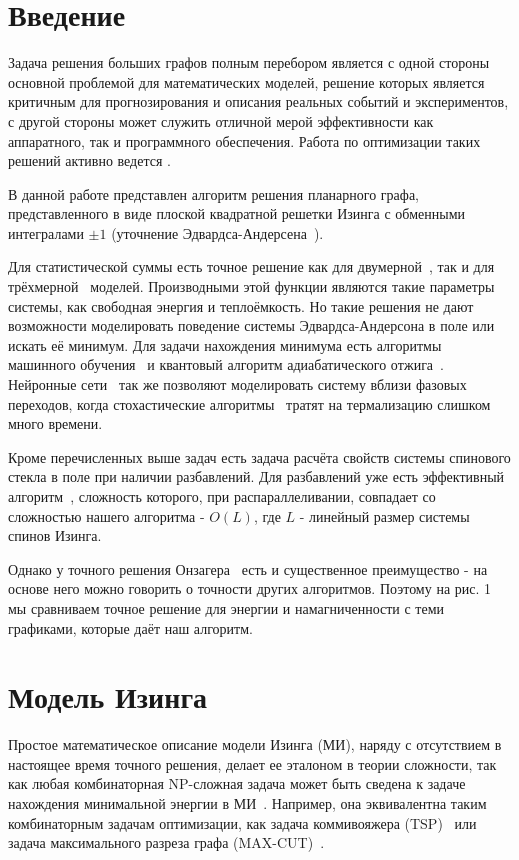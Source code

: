 \documentclass[10pt]{article}
\begin{document}
	
	\section*{Введение}
	
	Задача решения больших графов полным перебором является с одной стороны основной проблемой для математических моделей, решение которых является критичным для прогнозирования и описания реальных событий и экспериментов, с другой стороны может служить отличной мерой эффективности как аппаратного, так и программного обеспечения. Работа по оптимизации таких решений активно ведется \cite{romero2020high}. 
	
	В данной работе представлен алгоритм решения планарного графа, представленного в виде плоской квадратной решетки Изинга с обменными интегралами $\pm 1$ (уточнение Эдвардса-Андерсена~\cite{roma2010ground, katzgraber2005correlation}). 
	
	Для статистической суммы есть точное решение как для двумерной~\cite{onsager1944crystal}, так и для трёхмерной~\cite{zhang2023exact} моделей. Производными этой функции являются такие параметры системы, как свободная энергия и теплоёмкость. Но такие решения не дают возможности моделировать поведение системы Эдвардса-Андерсона в поле или искать её минимум. Для задачи нахождения минимума есть алгоритмы машинного обучения~\cite{maren1991logical} и квантовый алгоритм адиабатического отжига~\cite{grant2020adiabatic}. Нейронные сети~\cite{Korol2021} так же позволяют моделировать систему вблизи фазовых переходов, когда стохастические алгоритмы~\cite{janke2008monte} тратят на термализацию слишком много времени.
	
	Кроме перечисленных выше задач есть задача расчёта свойств системы спинового стекла в поле при наличии разбавлений. Для разбавлений уже есть эффективный алгоритм~\cite{loh2006efficient}, сложность которого, при распараллеливании, совпадает со сложностью нашего алгоритма - $O(L)$, где $L$ - линейный размер системы спинов Изинга.
	
	Однако у точного решения Онзагера~\cite{onsager1944crystal} есть и существенное преимущество - на основе него можно говорить о точности других алгоритмов. Поэтому на рис. 1 мы сравниваем точное решение для энергии и намагниченности с теми графиками, которые даёт наш алгоритм.
	
	\section{Модель Изинга}
	Простое математическое описание модели Изинга (МИ), наряду с отсутствием в настоящее время точного решения, делает ее эталоном в теории сложности, так как любая комбинаторная NP-сложная задача может быть сведена к задаче нахождения минимальной энергии в МИ~\cite{Markovich2019}. Например, она эквивалентна таким комбинаторным задачам оптимизации, как задача коммивояжера (TSP)~\cite{papadimitriou1977euclidean} или задача максимального разреза графа ({}MAX-CUT)~\cite{karp2010reducibility}.
	
\end{document}
